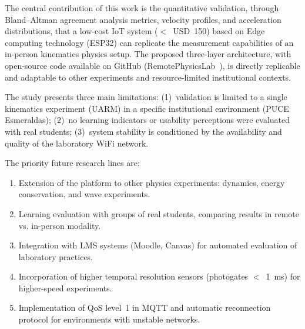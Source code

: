 \documentclass[sensors,article,submit,pdftex]{Definitions/mdpi}
\begin{document}
The central contribution of this work is the quantitative validation, through Bland--Altman agreement analysis metrics, velocity profiles, and acceleration distributions, that a low-cost IoT system ($<$~USD~150) based on Edge computing technology (ESP32) can replicate the measurement capabilities of an in-person kinematics physics setup. The proposed three-layer architecture, with open-source code available on GitHub (RemotePhysicsLab~\cite{r15}), is directly replicable and adaptable to other experiments and resource-limited institutional contexts.

The study presents three main limitations: (1)~validation is limited to a single kinematics experiment (UARM) in a specific institutional environment (PUCE Esmeraldas); (2)~no learning indicators or usability perceptions were evaluated with real students; (3)~system stability is conditioned by the availability and quality of the laboratory WiFi network.

The priority future research lines are:
\begin{enumerate}[label=(\arabic*)]
  \item Extension of the platform to other physics experiments: dynamics, energy conservation, and wave experiments.
  \item Learning evaluation with groups of real students, comparing results in remote vs. in-person modality.
  \item Integration with LMS systems (Moodle, Canvas) for automated evaluation of laboratory practices.
  \item Incorporation of higher temporal resolution sensors (photogates $<$~1~ms) for higher-speed experiments.
  \item Implementation of QoS level~1 in MQTT and automatic reconnection protocol for environments with unstable networks.
\end{enumerate}

\end{document}
